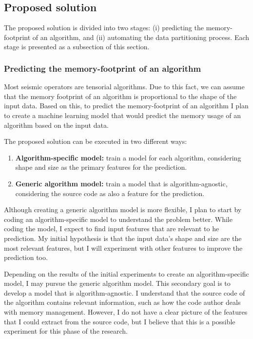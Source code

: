 \subsection{Proposed solution}
\label{subsec:proposed-solution}

The proposed solution is divided into two stages:
(i) predicting the memory-footprint of an algorithm, and
(ii) automating the data partitioning process.
Each stage is presented as a subsection of this section.

\subsubsection{Predicting the memory-footprint of an algorithm}

Most seismic operators are tensorial algorithms.
Due to this fact, we can assume that the memory footprint of an algorithm is proportional to the shape of the input data.
Based on this, to predict the memory-footprint of an algorithm I plan to create a machine learning model that would predict the memory usage of an algorithm based on the input data. 

The proposed solution can be executed in two different ways:

\begin{enumerate}
  \item \textbf{Algorithm-specific model:} train a model for each algorithm, considering  shape and size as the primary features for the prediction.
  \item \textbf{Generic algorithm model:} train a model that is algorithm-agnostic, considering the source code as also a feature for the prediction.
\end{enumerate}

Although creating a generic algorithm model is more flexible, I plan to start by coding an algorithm-specific model to understand the problem better.
While coding the model, I expect to find input features that are relevant to he prediction.
My initial hypothesis is that the input data's shape and size are the most relevant features, but I will experiment with other features to improve the prediction too.

Depending on the results of the initial experiments to create an algorithm-specific model, I may pursue the generic algorithm model.
This secondary goal is to develop a model that is algorithm-agnostic.
I understand that the source code of the algorithm contains relevant information, such as how the code author deals with memory management.
However, I do not have a clear picture of the features that I could extract from the source code, but I believe that this is a possible experiment for this phase of the research.

